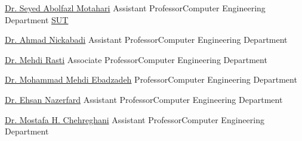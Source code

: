 
\newcommand{\cesuffix}{{\enskip\cdotp\enskip}Computer Engineering Department}

\begin{cvhonors}

  \cvref
    {\href{https://scholar.google.com/citations?user=rJ-biB0AAAAJ&hl=en}{Dr. Seyed Abolfazl Motahari}} %
    {Assistant Professor\cesuffix} %
    {\href{https://www.sharif.edu}{SUT}} %

  \cvref
    {\href{https://scholar.google.com/citations?user=pSMNSZwAAAAJ&hl=en}{Dr. Ahmad Nickabadi}} %
    {Assistant Professor\cesuffix} %
    {} %

  \cvref
    {\href{https://scholar.google.com/citations?user=zb8pjMYAAAAJ&hl=en}{Dr. Mehdi Rasti}} %
    {Associate Professor\cesuffix} %
    {} %

  \cvref
    {\href{https://scholar.google.com/citations?user=080Y\_lUAAAAJ&hl=en}{Dr. Mohammad Mehdi Ebadzadeh}} %
    {Professor\cesuffix} %
    {} %

  \cvref
    {\href{https://scholar.google.com/citations?user=Cl5tre8AAAAJ&hl=en}{Dr. Ehsan Nazerfard}} %
    {Assistant Professor\cesuffix} %
    {} %

  \cvref
    {\href{https://scholar.google.com/citations?user=8Hhu1Q8AAAAJ&hl=en}{Dr. Mostafa H. Chehreghani}} %
    {Assistant Professor\cesuffix} %
    {} %




\end{cvhonors}
